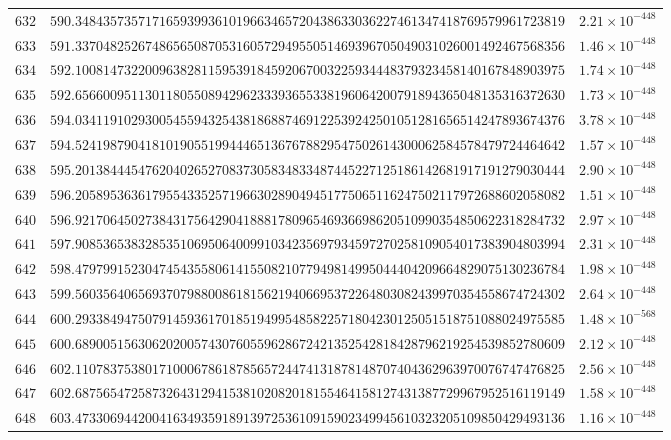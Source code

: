 \documentclass[12pt,reqno]{amsart}
\theoremstyle{remark}
\begin{document}
\begin{longtable}{clc}
$632$ & $590.3484357357171659399361019663465720438633036227461347418769579961723819$ & $2.21\times 10^{-448}$ \\
$633$ & $591.3370482526748656508705316057294955051469396705049031026001492467568356$ & $1.46\times 10^{-448}$ \\
$634$ & $592.1008147322009638281159539184592067003225934448379323458140167848903975$ & $1.74\times 10^{-448}$ \\
$635$ & $592.6566009511301180550894296233393655338196064200791894365048135316372630$ & $1.73\times 10^{-448}$ \\
$636$ & $594.0341191029300545594325438186887469122539242501051281656514247893674376$ & $3.78\times 10^{-448}$ \\
$637$ & $594.5241987904181019055199444651367678829547502614300062584578479724464642$ & $1.57\times 10^{-448}$ \\
$638$ & $595.2013844454762040265270837305834833487445227125186142681917191279030444$ & $2.90\times 10^{-448}$ \\
$639$ & $596.2058953636179554335257196630289049451775065116247502117972688602058082$ & $1.51\times 10^{-448}$ \\
$640$ & $596.9217064502738431756429041888178096546936698620510990354850622318284732$ & $2.97\times 10^{-448}$ \\
$641$ & $597.9085365383285351069506400991034235697934597270258109054017383904803994$ & $2.31\times 10^{-448}$ \\
$642$ & $598.4797991523047454355806141550821077949814995044404209664829075130236784$ & $1.98\times 10^{-448}$ \\
$643$ & $599.5603564065693707988008618156219406695372264803082439970354558674724302$ & $2.64\times 10^{-448}$ \\
$644$ & $600.2933849475079145936170185194995485822571804230125051518751088024975585$ & $1.48\times 10^{-568}$ \\
$645$ & $600.6890051563062020057430760559628672421352542818428796219254539852780609$ & $2.12\times 10^{-448}$ \\
$646$ & $602.1107837538017100067861878565724474131878148707404362963970076747476825$ & $2.56\times 10^{-448}$ \\
$647$ & $602.6875654725873264312941538102082018155464158127431387729967952516119149$ & $1.58\times 10^{-448}$ \\
$648$ & $603.4733069442004163493591891397253610915902349945610323205109850429493136$ & $1.16\times 10^{-448}$ \\

\end{longtable}
\end{document}
